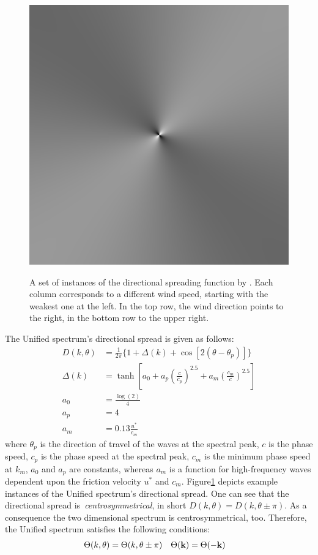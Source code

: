\begin{figure}
{ }
 \hfill
 \subtop
 {
 \includegraphics[scale=0.25]{figures/unified_dfilt_wur_sqrt200.png}
 }
\caption{A set of instances of the directional spreading function by
\citet{article:Elfouhaily1997}. Each column 
corresponds to a different wind speed, starting with the weakest one at the 
left. In the top row, the wind direction points to the right, in the bottom row 
to the upper right.}
\label{fig:unified_directional_filter}
\end{figure}
%
The Unified spectrum's directional spread is given as follows:
%
\begin{subequations}
\begin{align}
D(k, \theta) &= \frac{1}{2\pi}\{1 + \Delta(k) + \cos[2(\theta - 
\theta_p)]\} \\
\Delta(k) &= \tanh\left[a_0 + a_p\left(\frac{c}{c_p}\right)^{2.5} + 
a_m\left(\frac{c_m}{c}\right)^{2.5}\right] \\
a_0 &= \frac{\log(2)}{4} \\
a_p &= 4 \\
a_m &= 0.13 \frac{u^{\ast}}{c_m}
\end{align}
\end{subequations}
where $\theta_p$ is the direction of travel of the waves at the spectral peak,
$c$ is the phase speed, $c_p$ is the phase speed at the spectral peak, $c_m$
is the minimum phase speed at $k_m$, $a_0$ and $a_p$ are constants, whereas $a_m$
is a function for high-frequency waves dependent upon the friction velocity
$u^\ast$ and $c_m$. Figure\ref{fig:unified_directional_filter} depicts example
instances of the Unified spectrum's directional spread. One can see that the
directional spread is~\emph{centrosymmetrical}, in short
$D(k, \theta) = D(k, \theta \pm \pi)$. As a consequence the two dimensional
spectrum is centrosymmetrical, too. Therefore, the Unified spectrum satisfies
the following conditions:
\begin{align*}
\Theta(k, \theta) &= \Theta(k, \theta \pm \pi) & \Theta(\mathbf{k}) &= \Theta(-\mathbf{k})
\end{align*}
%
